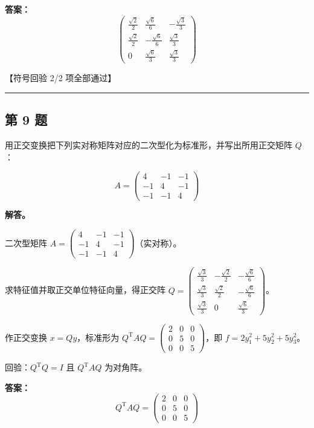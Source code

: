 \documentclass[12pt, a4paper]{article}
\newcommand{\problem}[1]{\subsection*{第 #1 题}}
\newcommand{\solution}{\textbf{解答。}}
\begin{document}
\textbf{答案：}
{\small
\[\begin{pmatrix} \frac{\sqrt{2}}{2} & \frac{\sqrt{6}}{6} & - \frac{\sqrt{3}}{3} \\ \frac{\sqrt{2}}{2} & - \frac{\sqrt{6}}{6} & \frac{\sqrt{3}}{3} \\ 0 & \frac{\sqrt{6}}{3} & \frac{\sqrt{3}}{3} \end{pmatrix}\]
}

\textcolor{okgreen}{【符号回验 2/2 项全部通过】}

\vspace{0.8em}
\hrule
\vspace{0.8em}

\problem{9}

用正交变换把下列实对称矩阵对应的二次型化为标准形，并写出所用正交矩阵 $Q$：

$$
A = \begin{pmatrix} 4 & -1 & -1 \\ -1 & 4 & -1 \\ -1 & -1 & 4 \end{pmatrix}
$$

\solution

二次型矩阵 $A = \begin{pmatrix} 4 & -1 & -1 \\ -1 & 4 & -1 \\ -1 & -1 & 4 \end{pmatrix}$（实对称）。

求特征值并取正交单位特征向量，得正交阵 $Q = \begin{pmatrix} \frac{\sqrt{3}}{3} & - \frac{\sqrt{2}}{2} & - \frac{\sqrt{6}}{6} \\ \frac{\sqrt{3}}{3} & \frac{\sqrt{2}}{2} & - \frac{\sqrt{6}}{6} \\ \frac{\sqrt{3}}{3} & 0 & \frac{\sqrt{6}}{3} \end{pmatrix}$。

作正交变换 $x = Qy$，标准形为 $Q^{\mathrm{T}}AQ = \begin{pmatrix} 2 & 0 & 0 \\ 0 & 5 & 0 \\ 0 & 0 & 5 \end{pmatrix}$，即 $f = 2y_1^2 + 5y_2^2 + 5y_3^2$。

回验：$Q^{\mathrm{T}}Q = I$ 且 $Q^{\mathrm{T}}AQ$ 为对角阵。

\textbf{答案：}
{\small
\[Q^{\mathrm{T}}AQ = \begin{pmatrix} 2 & 0 & 0 \\ 0 & 5 & 0 \\ 0 & 0 & 5 \end{pmatrix}\]
}
\end{document}

